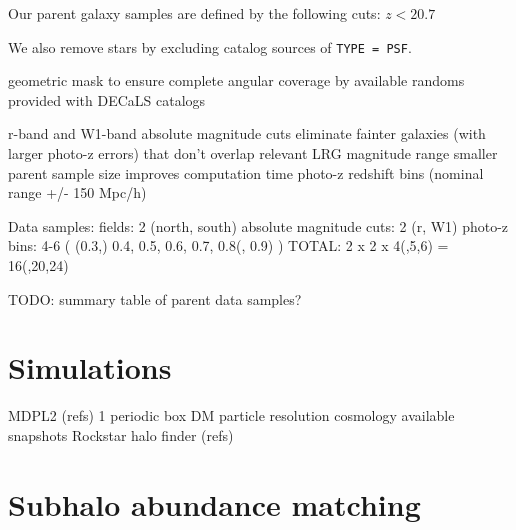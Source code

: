 \documentclass[twocolumn,apj,iop,tighten]{emulateapj2}
\begin{document}
Our parent galaxy samples are defined by the following cuts:
$z < 20.7$

We also remove stars by excluding catalog sources of \texttt{TYPE = PSF}.

geometric mask to ensure complete angular coverage by available randoms provided with DECaLS catalogs

r-band and W1-band absolute magnitude cuts
	eliminate fainter galaxies (with larger photo-z errors) that don't overlap relevant LRG magnitude range
	smaller parent sample size improves computation time
photo-z redshift bins (nominal range +/- 150 Mpc/h)

Data samples:
	fields: 2 (north, south)
	absolute magnitude cuts: 2 (r, W1)
	photo-z bins: 4-6 ( (0.3,) 0.4, 0.5, 0.6, 0.7, 0.8(, 0.9) )
TOTAL: 2 x 2 x 4(,5,6) = 16(,20,24)

TODO: summary table of parent data samples?





\section{Simulations}\label{sec:sims}

MDPL2 (refs)
1 \Gpch periodic box
DM particle resolution
cosmology
available snapshots
Rockstar halo finder (refs)


\section{Subhalo abundance matching}\label{sec:sham}
\end{document}
